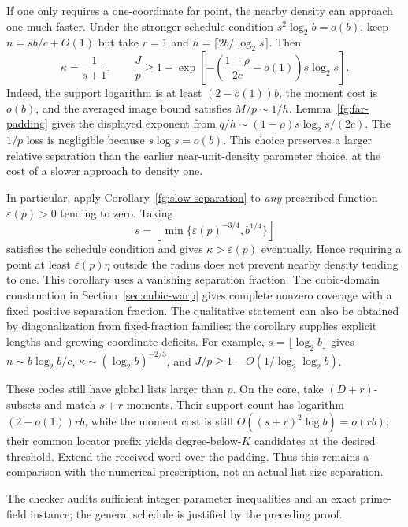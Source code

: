 If one only requires a one-coordinate far point, the nearby density
can approach one much faster. Under the stronger schedule condition
$s^2\log_2b=o(b)$, keep $n=sb/c+O(1)$ but take $r=1$ and
$h=\lceil2b/\log_2s\rceil$. Then
\[
 \kappa=\frac1{s+1},\qquad
 \frac Jp\ge1-\exp\!\left[-\left(\frac{1-\rho}{2c}-o(1)\right)
 s\log_2s\right].
\]
Indeed, the support logarithm is at least $(2-o(1))b$, the moment
cost is $o(b)$, and the averaged image bound satisfies $M/p\sim1/h$.
Lemma~\ref{fg:far-padding} gives the displayed exponent from
$q/h\sim(1-\rho)s\log_2s/(2c)$. The $1/p$ loss is negligible because
$s\log s=o(b)$. This choice preserves a larger relative separation
than the earlier near-unit-density parameter choice, at the cost of
a slower approach to density one.

In particular, apply Corollary~\ref{fg:slow-separation} to \emph{any}
prescribed function $\varepsilon(p)>0$
tending to zero. Taking
\[
 s=\left\lfloor\min\{\varepsilon(p)^{-3/4},b^{1/4}\}\right\rfloor
\]
satisfies the schedule condition and gives
$\kappa>\varepsilon(p)$ eventually. Hence requiring a point at least
$\varepsilon(p)\eta$ outside the radius does not prevent nearby density
tending to one. This corollary uses a vanishing separation fraction. The cubic-domain
construction in Section~\ref{sec:cubic-warp} gives complete nonzero
coverage with a fixed positive separation fraction. The qualitative statement
can also be obtained by diagonalization from fixed-fraction families;
the corollary supplies explicit lengths and growing coordinate deficits.
For example, $s=\lfloor\log_2b\rfloor$ gives
$n\sim b\log_2b/c$, $\kappa\sim(\log_2b)^{-2/3}$, and
$J/p\ge1-O(1/\log_2\log_2b)$.

These codes still have global lists larger than $p$. On the core, take
$(D+r)$-subsets and match $s+r$ moments. Their support count has
logarithm $(2-o(1))rb$, while the moment cost is still
$O((s+r)^2\log b)=o(rb)$; their common locator prefix yields
degree-below-$K$ candidates at the desired threshold. Extend the
received word over the padding. Thus this remains a comparison with
the numerical prescription, not an actual-list-size separation.

The checker  audits sufficient integer
parameter inequalities and an exact prime-field instance; the general
schedule is justified by the preceding proof.
